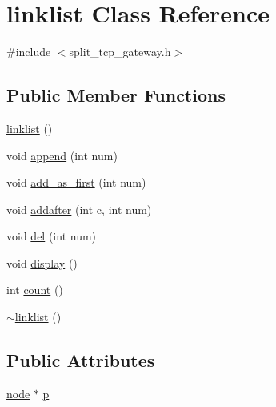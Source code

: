 \hypertarget{classlinklist}{\section{linklist \-Class \-Reference}
\label{classlinklist}
}


{\ttfamily \#include $<$split\-\_\-tcp\-\_\-gateway.\-h$>$}

\subsection*{\-Public \-Member \-Functions}
\begin{DoxyCompactItemize}
\item 
\hyperlink{classlinklist_a18d8e4448b81a4910cb6527324e54802}{linklist} ()
\item 
void \hyperlink{classlinklist_a340a7e6dd0df788e816dd65609e6b83c}{append} (int num)
\item 
void \hyperlink{classlinklist_a29765d5e426d460fdd42a49519323351}{add\-\_\-as\-\_\-first} (int num)
\item 
void \hyperlink{classlinklist_a4d166c780e44f00a80c89944850a2d6f}{addafter} (int c, int num)
\item 
void \hyperlink{classlinklist_a0005103ddb185c304495483e224201bd}{del} (int num)
\item 
void \hyperlink{classlinklist_a9bdd2eacd02572167b4e2c98791f4054}{display} ()
\item 
int \hyperlink{classlinklist_a244ea3939fd959b4c386bd931c46621c}{count} ()
\item 
\hyperlink{classlinklist_a6791b18d7d5c39ab4ab5bacaf90bd4ba}{$\sim$linklist} ()
\end{DoxyCompactItemize}
\subsection*{\-Public \-Attributes}
\begin{DoxyCompactItemize}
\item 
\hyperlink{structnode}{node} $\ast$ \hyperlink{classlinklist_a42f9d72d5d5def91acf484d8c818ccc7}{p}
\end{DoxyCompactItemize}


